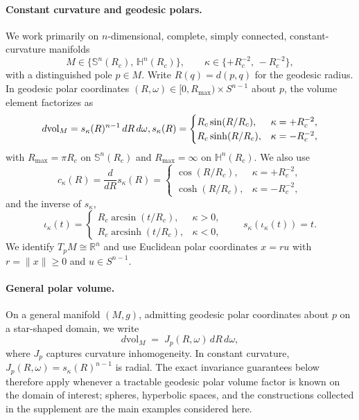 \documentclass{article}
\theoremstyle{definition}
\theoremstyle{remark}
\newcommand{\SSS}{\mathbb{S}}
\newcommand{\HH}{\mathbb{H}}
\begin{document}
\paragraph{Constant curvature and geodesic polars.}
We work primarily on \(n\)-dimensional, complete, simply connected, constant-curvature manifolds
\[
M \in \{\SSS^n(R_c),\, \HH^n(R_c)\},
\qquad
\kappa \in \{+R_c^{-2},\, -R_c^{-2}\},
\]
with a distinguished pole \(p\in M\). Write \(R(q)=d(p,q)\) for the geodesic radius. In geodesic polar coordinates \((R,\omega)\in[0,R_{\max})\times S^{n-1}\) about \(p\), the volume element factorizes as
\begin{equation}
d\mathrm{vol}_M = s_\kappa(R)^{n-1}\, dR\, d\omega, \\
s_\kappa(R) =
\begin{cases}
R_c \sin(R/R_c), & \kappa = +R_c^{-2},\\
R_c \sinh(R/R_c), & \kappa = -R_c^{-2},
\end{cases}
\label{eq:polar-volume}
\end{equation}
with \(R_{\max}=\pi R_c\) on \(\SSS^n(R_c)\) and \(R_{\max}=\infty\) on \(\HH^n(R_c)\). We also use
\[
c_\kappa(R)=\frac{d}{dR}s_\kappa(R)=
\begin{cases}
\cos(R/R_c), & \kappa = +R_c^{-2},\\
\cosh(R/R_c), & \kappa = -R_c^{-2},
\end{cases}
\]
and the inverse of \(s_\kappa\),
\[
\iota_\kappa(t)=
\begin{cases}
R_c \arcsin(t/R_c), & \kappa>0,\\
R_c \operatorname{arcsinh}(t/R_c), & \kappa<0,
\end{cases}
\qquad
s_\kappa(\iota_\kappa(t))=t.
\]
We identify \(T_pM \cong \mathbb R^n\) and use Euclidean polar coordinates \(x=ru\) with \(r=\|x\|\ge 0\) and \(u\in S^{n-1}\).

\paragraph{General polar volume.}
On a general manifold $(M,g)$, admitting geodesic polar coordinates about $p$
on a star-shaped domain, we write
\begin{equation}
  d\mathrm{vol}_M \;=\; J_p(R,\omega)\,dR\,d\omega,
  \label{eq:general-polar-volume}
\end{equation}
where $J_p$ captures curvature inhomogeneity. In constant curvature,
$J_p(R,\omega)=s_\kappa(R)^{n-1}$ is radial. The exact invariance guarantees below therefore apply whenever a tractable geodesic polar volume factor is known on the domain of interest; spheres, hyperbolic spaces, and the constructions collected in the supplement are the main examples considered here.
\end{document}
